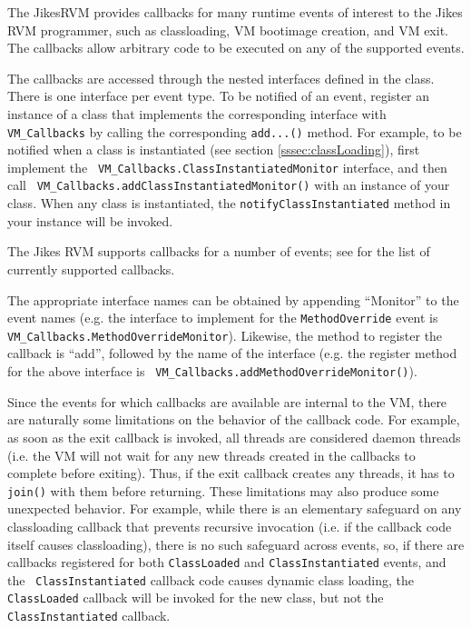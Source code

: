 

The Jikes\trademark RVM provides callbacks for many runtime events of
interest to the Jikes RVM 
programmer, such as classloading, VM bootimage creation, and VM exit.  The
callbacks allow arbitrary code to be executed on any of the supported events.

The callbacks are accessed through the nested interfaces defined in the 
class.  There is one interface per event type.  To be notified
of an event, register an instance of a class that implements the corresponding
interface with {\tt VM\_Callbacks} by calling the corresponding {\tt add...()}
method.  For example, to be notified when a class is instantiated (see section
\ref{sssec:classLoading}), first implement the {\tt
VM\_Callbacks.ClassInstantiatedMonitor} interface, and then call {\tt
VM\_Callbacks.addClassInstantiatedMonitor()} with an instance of your class.
When any class is instantiated, the {\tt notifyClassInstantiated} method in
your instance will be invoked.

The Jikes RVM supports callbacks for a number of events; see 
 for the list of currently
supported callbacks.

The appropriate interface names can be obtained by appending ``Monitor'' to the
event names (e.g. the interface to implement for the {\tt MethodOverride} event
is {\tt VM\_Callbacks.MethodOverrideMonitor}).  Likewise, the method to
register the callback is ``add'', followed by the name of the interface (e.g.
the register method for the above interface is {\tt
VM\_Callbacks.addMethodOverrideMonitor()}).

Since the events for which callbacks are available are internal to the VM,
there are naturally some limitations on the behavior of the callback code.  For
example, as soon as the exit callback is invoked, all threads are considered
daemon threads (i.e. the VM will not wait for any new threads created in the
callbacks to complete before exiting).  Thus, if the exit callback creates any
threads, it has to {\tt join()} with them before returning.  These limitations
may also produce some unexpected behavior.  For example, while there is an
elementary safeguard on any classloading callback that prevents recursive
invocation (i.e. if the callback code itself causes classloading), there is no
such safeguard across events, so, if there are callbacks registered for both
{\tt ClassLoaded} and {\tt ClassInstantiated} events, and the {\tt
ClassInstantiated} callback code causes dynamic class loading, the {\tt
ClassLoaded} callback will be invoked for the new class, but not the {\tt
ClassInstantiated} callback.

